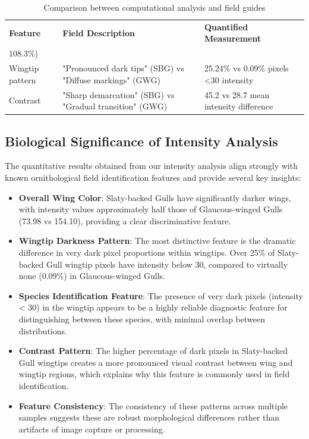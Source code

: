 \documentclass[a4paper,12pt]{report}
\begin{document}
\begin{table}[H]
\centering
\caption{Comparison between computational analysis and field guides}
\label{tab:field_comparison}
\begin{tabular}{lp{6cm}p{6cm}}
\hline
\textbf{Feature} & \textbf{Field Description} & \textbf{Quantified Measurement} \\108.3\%) \\
Wingtip pattern & "Pronounced dark tips" (SBG) vs "Diffuse markings" (GWG) & 25.24\% vs 0.09\% pixels <30 intensity \\
Contrast & "Sharp demarcation" (SBG) vs "Gradual transition" (GWG) & 45.2 vs 28.7 mean intensity difference \\
\end{tabular}
\end{table}


\subsection{Biological Significance of Intensity Analysis}
The quantitative results obtained from our intensity analysis align strongly with known ornithological field identification features and provide several key insights:

\begin{itemize}
    \item \textbf{Overall Wing Color}: Slaty-backed Gulls have significantly darker wings, with intensity values approximately half those of Glaucous-winged Gulls (73.98 vs 154.10), providing a clear discriminative feature.
    
    \item \textbf{Wingtip Darkness Pattern}: The most distinctive feature is the dramatic difference in very dark pixel proportions within wingtips. Over 25\% of Slaty-backed Gull wingtip pixels have intensity below 30, compared to virtually none (0.09\%) in Glaucous-winged Gulls.
    
    \item \textbf{Species Identification Feature}: The presence of very dark pixels (intensity < 30) in the wingtip appears to be a highly reliable diagnostic feature for distinguishing between these species, with minimal overlap between distributions.
    
    \item \textbf{Contrast Pattern}: The higher percentage of dark pixels in Slaty-backed Gull wingtips creates a more pronounced visual contrast between wing and wingtip regions, which explains why this feature is commonly used in field identification.
    
    \item \textbf{Feature Consistency}: The consistency of these patterns across multiple samples suggests these are robust morphological differences rather than artifacts of image capture or processing.
\end{itemize}
\end{document}
